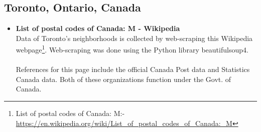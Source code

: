 \documentclass{article}
\begin{document}
\subsection{Toronto, Ontario, Canada}
\begin{itemize}
    \item \textbf{List of postal codes of Canada: M - Wikipedia}\\{Data of Toronto's neighborhoods is collected by web-scraping this Wikipedia webpage\footnote{List of postal codes of Canada: M:- \url{https://en.wikipedia.org/wiki/List_of_postal_codes_of_Canada:_M}}. Web-scraping was done using the Python library beautifulsoup4.}\\\\{References for this page include the official Canada Post data and Statistics Canada data. Both of these organizations function under the Govt. of Canada.}
\end{itemize}
\end{document}

